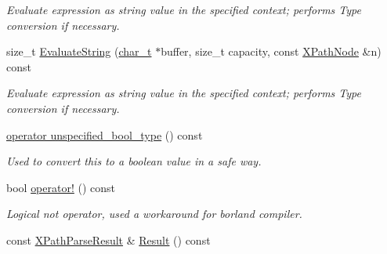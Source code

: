\begin{DoxyCompactItemize}
\begin{DoxyCompactList}\small\item\em Evaluate expression as string value in the specified context; performs Type conversion if necessary. \item\end{DoxyCompactList}\item 
size\_\-t \hyperlink{classphys_1_1xml_1_1XPathQuery_ac9f4705c639cbd7f3aef8266fa683cc2}{EvaluateString} (\hyperlink{namespacephys_1_1xml_afc87705cd1c2917d87b879715a2d8f6e}{char\_\-t} $\ast$buffer, size\_\-t capacity, const \hyperlink{classphys_1_1xml_1_1XPathNode}{XPathNode} \&n) const 
\begin{DoxyCompactList}\small\item\em Evaluate expression as string value in the specified context; performs Type conversion if necessary. \item\end{DoxyCompactList}\item 
\hyperlink{classphys_1_1xml_1_1XPathQuery_a1c6a8e78133a177792ade031f4ed0a89}{operator unspecified\_\-bool\_\-type} () const 
\begin{DoxyCompactList}\small\item\em Used to convert this to a boolean value in a safe way. \item\end{DoxyCompactList}\item 
bool \hyperlink{classphys_1_1xml_1_1XPathQuery_afe0b62e0ab607855f5267b0690bda33b}{operator!} () const 
\begin{DoxyCompactList}\small\item\em Logical not operator, used a workaround for borland compiler. \item\end{DoxyCompactList}\item 
\hypertarget{classphys_1_1xml_1_1XPathQuery_a83f2039e91105c9cd0dcc7d524359198}{
const \hyperlink{structphys_1_1xml_1_1XPathParseResult}{XPathParseResult} \& \hyperlink{classphys_1_1xml_1_1XPathQuery_a83f2039e91105c9cd0dcc7d524359198}{Result} () const }
\label{classphys_1_1xml_1_1XPathQuery_a83f2039e91105c9cd0dcc7d524359198}


\end{DoxyCompactItemize}
